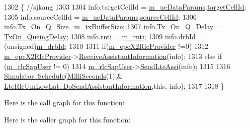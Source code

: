 \begin{DoxyCode}
1302                                                                                        \{ \textcolor{comment}{//sjkang}
1303 
1304         info.targetCellId = \hyperlink{classns3_1_1LteRlc_a6f4d5d0a7f8d3dd3c35a5fc0598ea3b8}{m\_ueDataParams}.\hyperlink{structns3_1_1EpcX2Sap_1_1UeDataParams_ae1b898ec9d57743aa53989ef3e30115a}{targetCellId};
1305         info.sourceCellId = \hyperlink{classns3_1_1LteRlc_a6f4d5d0a7f8d3dd3c35a5fc0598ea3b8}{m\_ueDataParams}.\hyperlink{structns3_1_1EpcX2Sap_1_1UeDataParams_aa7874679502767d1cad719fb7dd4a4bb}{sourceCellId};
1306     info.Tx\_On\_Q\_Size=\hyperlink{classns3_1_1LteRlcUmLowLat_a730b3933118b7d511e4aedab828e07aa}{m\_txBufferSize};
1307     info.Tx\_On\_Q\_Delay = \hyperlink{classns3_1_1LteRlcUmLowLat_a3f4fe8416c6ad14ff611b0b57f961afa}{TxOn\_QueingDelay};
1308     info.rnti = \hyperlink{classns3_1_1LteRlc_a48ab0a78e7f2687337075b1c8832df70}{m\_rnti};
1309     info.drbId = (unsigned)\hyperlink{classns3_1_1LteRlc_a34002cd9652c321a6c5279c97cfbe2ad}{m\_drbId};
1310 
1311     \textcolor{keywordflow}{if}(\hyperlink{classns3_1_1LteRlc_aa997bbf2807b79443887abd57facd1c8}{m\_epcX2RlcProvider} !=0)
1312         \hyperlink{classns3_1_1LteRlc_aa997bbf2807b79443887abd57facd1c8}{m\_epcX2RlcProvider}->\hyperlink{classns3_1_1EpcX2RlcProvider_aac32484a4ef127a3e692e80152fc1219}{ReceiveAssistantInformation}(info);
1313     \textcolor{keywordflow}{else} \textcolor{keywordflow}{if} (\hyperlink{classns3_1_1LteRlc_a0156774a917567c2cee1f353d56dfffa}{m\_rlcSapUser} != 0)
1314     \hyperlink{classns3_1_1LteRlc_a0156774a917567c2cee1f353d56dfffa}{m\_rlcSapUser}->\hyperlink{classns3_1_1LteRlcSapUser_a08d268f7a773c87325bffcf8e01031a5}{SendLteAssi}(info);
1315 
1316               \hyperlink{classns3_1_1Simulator_a671882c894a08af4a5e91181bf1eec13}{Simulator::Schedule}(\hyperlink{group__timecivil_gaf26127cf4571146b83a92ee18679c7a9}{MilliSeconds}(1),&
      \hyperlink{classns3_1_1LteRlcUmLowLat_a4b446246590f6bfe283c69a9fc609f6e}{LteRlcUmLowLat::DoSendAssistantInformation},\textcolor{keyword}{this}, info);
1317 
1318 \}
\end{DoxyCode}


Here is the call graph for this function\+:




Here is the caller graph for this function\+:


